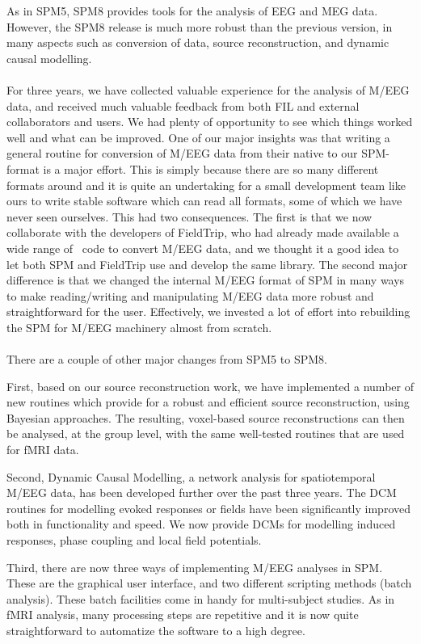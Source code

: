  As in SPM5, SPM8 provides tools for the analysis of EEG and MEG data. However, the SPM8 release is much more robust than the previous version, in many aspects such as conversion of data, source reconstruction, and dynamic causal modelling.
\\
\\
For three years, we have collected valuable experience for the analysis of M/EEG data, and received much valuable feedback from both FIL and external collaborators and users. We had plenty of opportunity to see which things worked well and what can be improved. One of our major insights was that writing a general routine for conversion of M/EEG data from their native to our SPM-format is a major effort. This is simply because there are so many different formats around and it is quite an undertaking for a small development team like ours to write stable software which can read all formats, some of which we have never seen ourselves. This had two consequences. The first is that we now collaborate with the developers of FieldTrip, who had already made available a wide range of \matlab\ code to convert M/EEG data, and we thought it a good idea to let both SPM and FieldTrip use and develop the same library. The second major difference is that we changed the internal M/EEG format of SPM in many ways to make reading/writing and manipulating M/EEG data more robust and straightforward for the user. Effectively, we invested a lot of effort into rebuilding the SPM for M/EEG machinery almost from scratch.
\\
\\
There are a couple of other major changes from SPM5 to SPM8.

First, based on our source reconstruction work, we have implemented a number of new routines which provide for a robust and efficient source reconstruction, using Bayesian approaches. The resulting, voxel-based source reconstructions can then be analysed, at the group level, with the same well-tested routines that are used for fMRI data.

Second, Dynamic Causal Modelling, a network analysis for spatiotemporal M/EEG data, has been developed further over the past three years. The DCM routines for modelling evoked responses or fields have been significantly improved both in functionality and speed. We now provide DCMs for modelling induced responses, phase coupling and local field potentials.

Third, there are now three ways of implementing M/EEG analyses in SPM. These are the graphical user interface, and two different scripting methods (batch analysis). These batch facilities come in handy for multi-subject studies. As in fMRI analysis, many processing steps are repetitive and it is now quite straightforward to automatize the software to a high degree.

